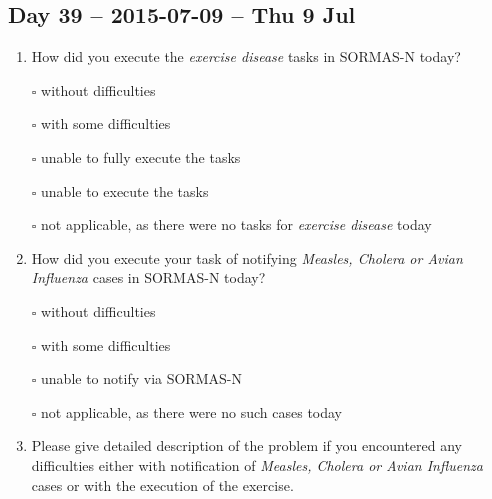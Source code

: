 \documentclass[a4paper, titlepage]{tufte-handout}
\begin{document}
\subsection{Day 39 -- 2015-07-09 -- Thu  9 Jul}
\label{sec-8-29}
\begin{enumerate}
\item How did you execute the \emph{exercise disease} tasks in SORMAS-N today?

\quad $\square$ without difficulties

\quad $\square$ with some difficulties

\quad $\square$ unable to fully execute the tasks

\quad $\square$ unable to execute the tasks

\quad $\square$ not applicable, as there were no tasks for \emph{exercise disease} today

\item How did you execute your task of notifying \emph{Measles, Cholera or Avian Influenza} cases in SORMAS-N today?

\quad $\square$ without difficulties

\quad $\square$ with some difficulties

\quad $\square$ unable to notify via SORMAS-N

\quad $\square$ not applicable, as there were no such cases today

\item Please give detailed description of the problem if you encountered any difficulties either with notification of \emph{Measles, Cholera or Avian Influenza} cases or with the execution of the exercise.

\hrulefill

\hrulefill

\hrulefill

\hrulefill

\hrulefill

\hrulefill

\hrulefill

\hrulefill

\hrulefill

\hrulefill
\end{enumerate}

\newpage
\end{document}
